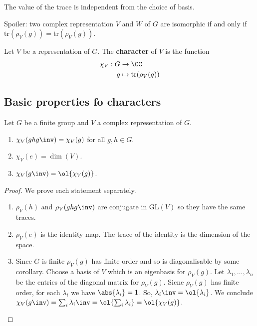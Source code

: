 \documentclass[12pt, a4paper]{article}
\newcommand{\gl}{\text{GL}}
\begin{document}
\begin{mdremark}
    The value of the trace is independent from the choice of basis.
\end{mdremark}

\begin{mdnote}
    Spoiler: two complex representation \(V\) and \(W\) of \(G\) are isomorphic if and only if \(\text{tr}(\rho_V(g))=\text{tr}(\rho_V(g))\).
\end{mdnote}

\begin{definition}
    Let \(V\) be a representation of \(G\). The \textbf{character} of \(V\) is the function 
    \[\begin{aligned}
        \chi_V : G &\to \CC \\
        g &\mapsto \text{tr}(\rho_V(g))
    \end{aligned}\]
\end{definition}

\subsection{Basic properties fo characters}

\begin{mdprop}
    Let \(G\) be a finite group and \(V\) a complex representation of \(G\).
    \begin{enumerate}
        \item \(\chi_V(ghg\inv)=\chi_V(g)\) for all \(g,h\in G\).
        \item \(\chi_V(e)=\dim(V)\).
        \item \(\chi_V(g\inv)=\ol{\chi_V(g)}\).
    \end{enumerate}
\end{mdprop}

\begin{proof}
    We prove each statement separately.
    \begin{enumerate}
        \item \(\rho_V(h)\) and \(\rho_V(ghg\inv)\) are conjugate in \(\gl(V)\) so they have the same traces.
        \item \(\rho_V(e)\) is the identity map. The trace of the identity is the dimension of the space.
        \item Since \(G\) is finite \(\rho_V(g)\) has finite order and so is diagonalisable by some corollary. Choose a basis of \(V\) which is an eigenbasis for \(\rho_V(g)\). Let \(\lambda_1,\ldots,\lambda_n\) be the entries of the diagonal matrix for \(\rho_V(g)\). Sicne \(\rho_V(g)\) has finite order, for each \(\lambda_i\) we have \(\abs{\lambda_i}=1\). So, \(\lambda_i\inv=\ol{\lambda_i}\). We conclude \(\chi_V(g\inv)=\sum_i \lambda_i\inv =\ol{\sum_i \lambda_i}=\ol{\chi_V(g)}\).
    \end{enumerate}
\end{proof}
\end{document}
